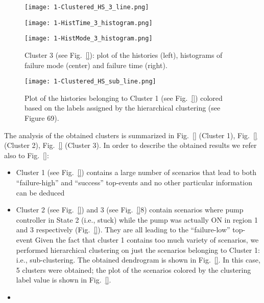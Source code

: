 \begin{figure}
  \centering
  \begin{minipage}{.33\textwidth}
  \centering
  \texttt{[image: 1-Clustered\_HS\_3\_line.png]}
  \end{minipage}\hfill
  \begin{minipage}{.33\textwidth}
  \centering
  \texttt{[image: 1-HistTime\_3\_histogram.png]}
  \end{minipage}\hfill
  \begin{minipage}{.33\textwidth}
  \centering
  \texttt{[image: 1-HistMode\_3\_histogram.png]}
  \end{minipage}
  \caption{Cluster 3 (see Fig.~\ref{}): plot of the histories (left), histograms of failure mode 
           (center) and failure time (right).}
  \label{fig:pump_cluster3}
\end{figure}

\begin{figure}
    \centering
    \centerline{\texttt{[image: 1-Clustered\_HS\_sub\_line.png]}} 
    \caption{Plot of the histories belonging to Cluster 1 (see Fig.~\ref{}) colored based on the 
             labels assigned by the hierarchical clustering (see Figure 69).}
    \label{fig:controllerDend1}
\end{figure}

The analysis of the obtained clusters is summarized in Fig.~\ref{} (Cluster 1), Fig.~\ref{} (Cluster 2), 
Fig.~\ref{} (Cluster 3). In order to describe the obtained results we refer also to Fig.~\ref{}:
\begin{itemize}
  \item Cluster 1 (see Fig.~\ref{}) contains a large number of scenarios that lead to both ``failure-high'' and 
        ``success'' top-events and no other particular information can be deduced
  \item Cluster 2 (see Fig.~\ref{}) and 3 (see Fig.~\ref{}8) contain scenarios where pump controller in 
        State 2 (i.e., stuck) while the pump was actually ON in region 1 and 3 respectively (Fig.~\ref{}). They
        are all leading to the “failure-low” top-event Given the fact that cluster 1 contains too much variety 
        of scenarios, we performed hierarchical clustering on just the scenarios belonging to Cluster 1:
        i.e., sub-clustering. The obtained dendrogram is shown in Fig.~\ref{}. In this case, 5 clusters 
        were obtained; the plot of the scenarios colored by the clustering label value is shown in Fig.~\ref{}.
\item 
\end{itemize}

